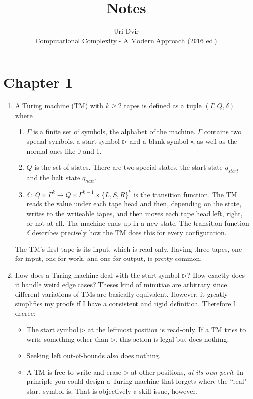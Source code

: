 \documentclass[12pt]{article}
\title{Notes}
\author{Uri Dvir \\ Computational Complexity - A Modern Approach (2016 ed.)}
\begin{document}
\maketitle

\section*{Chapter 1}

\begin{enumerate}
\item{
A Turing machine (TM) with $k \geq 2$ tapes is defined as a tuple $(\Gamma, Q, \delta)$ where
\begin{enumerate}
\item{$\Gamma$ is a finite set of symbols, the alphabet of the machine. $\Gamma$ contains two special symbols, a start symbol $\triangleright$ and a blank symbol $\square$, as well as the normal ones like 0 and 1.}
\item{$Q$ is the set of states. There are two special states, the start state $q_{start}$ and the halt state $q_{halt}$.}
\item{$\delta \,:\, Q \times \Gamma^k \rightarrow Q \times \Gamma^{k-1} \times \{ L, S, R \}^k$ is the transition function. The TM reads the value under each tape head and then, depending on the state, writes to the writeable tapes, and then moves each tape head left, right, or not at all. The machine ends up in a new state. The transition function $\delta$ describes precisely how the TM does this for every configuration.}
\end{enumerate}
The TM's first tape is its input, which is read-only. Having three tapes, one for input, one for work, and one for output, is pretty common.
}
\item{
How does a Turing machine deal with the start symbol $\triangleright$? How exactly does it handle weird edge cases? Theses kind of minutiae are arbitrary since different variations of TMs are basically equivalent. However, it greatly simplifies my proofs if I have a consistent and rigid definition. Therefore I decree:
\begin{itemize}
\item{The start symbol $\triangleright$ at the leftmost position is read-only. If a TM tries to write something other than $\triangleright$, this action is legal but does nothing.}
\item{Seeking left out-of-bounds also does nothing.}
\item{A TM is free to write and erase $\triangleright$ at other positions, \textit{at its own peril}. In principle you could design a Turing machine that forgets where the ``real" start symbol is. That is objectively a skill issue, however.}

\end{itemize}}
\end{enumerate}
\end{document}
